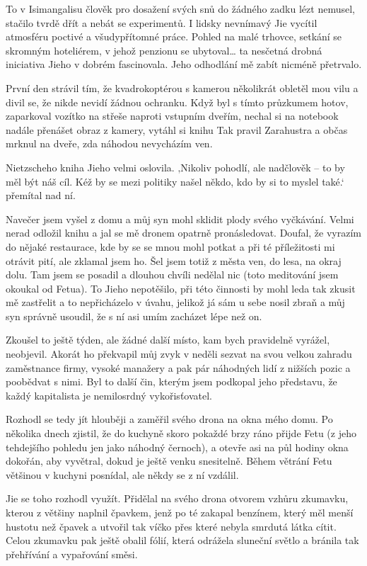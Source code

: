To v Isimangalisu člověk pro dosažení svých snů do žádného zadku lézt nemusel, stačilo tvrdě dřít a nebát se experimentů. I lidsky nevnímavý Jie vycítil atmosféru poctivé a všudypřítomné práce. Pohled na malé trhovce, setkání se skromným hoteliérem, v jehož penzionu se ubytoval… ta nesčetná drobná iniciativa Jieho v dobrém fascinovala. Jeho odhodlání mě zabít nicméně přetrvalo.

První den strávil tím, že  kvadrokoptérou s kamerou několikrát obletěl mou vilu a divil se, že nikde nevidí žádnou ochranku. Když byl s tímto průzkumem hotov, zaparkoval vozítko na střeše naproti vstupním dveřím, nechal si na notebook nadále přenášet obraz z kamery, vytáhl si knihu Tak pravil Zarahustra a občas mrknul na dveře, zda náhodou nevycházím ven.

Nietzscheho kniha Jieho velmi oslovila. ‚Nikoliv pohodlí, ale nadčlověk – to by měl být náš cíl. Kéž by se mezi politiky našel někdo, kdo by si to myslel také.‘ přemítal nad ní.

Navečer jsem vyšel z domu a můj syn mohl sklidit plody svého vyčkávání. Velmi nerad odložil knihu a jal se mě dronem opatrně pronásledovat. Doufal, že vyrazím do nějaké restaurace, kde by se se mnou mohl potkat a při té příležitosti mi otrávit pití, ale zklamal jsem ho. Šel jsem totiž z města ven, do lesa, na okraj dolu. Tam jsem se posadil a dlouhou chvíli nedělal nic (toto meditování jsem okoukal od Fetua).  To Jieho nepotěšilo, při této činnosti by mohl leda tak zkusit mě zastřelit a to nepřicházelo v úvahu, jelikož já sám u sebe nosil zbraň a můj syn správně usoudil, že s ní asi umím zacházet lépe než on.

Zkoušel to ještě týden, ale žádné další místo, kam bych pravidelně vyrážel, neobjevil. Akorát ho překvapil můj zvyk v neděli sezvat na svou velkou zahradu zaměstnance firmy, vysoké manažery a pak pár náhodných lidí z nižších pozic a poobědvat s nimi. Byl to další čin, kterým jsem podkopal jeho představu, že každý kapitalista je nemilosrdný vykořisťovatel.

Rozhodl se tedy jít hlouběji a zaměřil svého drona na okna mého domu. Po několika dnech zjistil, že do kuchyně skoro pokaždé brzy ráno přijde Fetu (z jeho tehdejšího pohledu jen jako náhodný černoch), a otevře asi na půl hodiny okna dokořán, aby vyvětral, dokud je ještě venku snesitelně. Během větrání Fetu většinou v kuchyni posnídal, ale někdy se z ní vzdálil.  

Jie se toho rozhodl využít. Přidělal na svého drona otvorem vzhůru zkumavku, kterou z většiny naplnil čpavkem, jenž po té zakapal benzínem, který měl menší hustotu než čpavek a utvořil tak víčko přes které nebyla smrdutá látka cítit. Celou zkumavku pak ještě obalil fólií, která odrážela sluneční světlo a bránila tak přehřívání a vypařování směsi.

